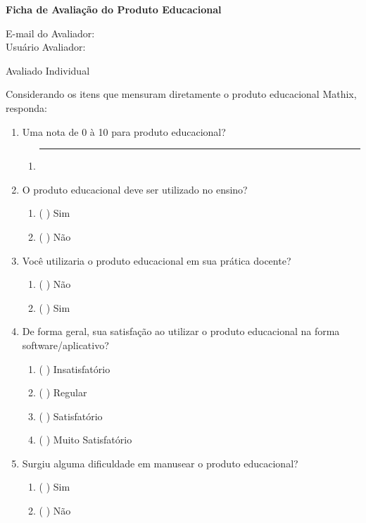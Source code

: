 \begin{apendicesenv}
\begin{center}
\textbf{
Ficha de Avaliação do Produto Educacional
}
\end{center}
E-mail do Avaliador:\hrulefill \\
Usuário Avaliador: \hrulefill \\

\begin{center}
Avaliado Individual  
\end{center}


Considerando os itens que mensuram diretamente o produto educacional Mathix, responda:


\begin{enumerate}

    \item Uma nota de 0 à 10 para produto educacional?
    \begin{enumerate}
        \item \rule{4cm}{.1pt}\\
    \end{enumerate}


    \item O produto educacional deve ser utilizado no ensino?
    \begin{enumerate}
        \item ( ) Sim
        \item ( ) Não
    \end{enumerate}
    
    
    \item Você utilizaria o produto educacional em sua prática docente?
    \begin{enumerate}
        \item ( ) Não
        \item ( ) Sim
    \end{enumerate}


    \item De forma geral, sua satisfação ao utilizar o produto educacional na forma software/aplicativo?
    \begin{enumerate}
        \item ( ) Insatisfatório
        \item ( ) Regular
        \item ( ) Satisfatório
        \item ( ) Muito Satisfatório
    \end{enumerate}


    \item Surgiu alguma dificuldade em manusear o produto educacional?
    \begin{enumerate}
        \item ( ) Sim
        \item ( ) Não
    \end{enumerate}



\end{enumerate}
\end{apendicesenv}
